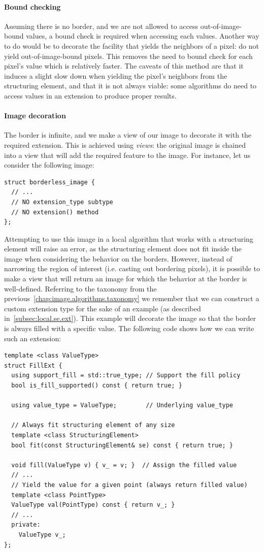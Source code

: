 \paragraph{Bound checking}
Assuming there is no border, and we are not allowed to access out-of-image-bound values, a bound check is required when
accessing each values. Another way to do would be to decorate the facility that yields the neighbors of a pixel: do not
yield out-of-image-bound pixels. This removes the need to bound check for each pixel's value which is relatively
faster. The caveats of this method are that it induces a slight slow down when yielding the pixel's neighbors from the
structuring element, and that it is not always viable: some algorithms do need to access values in an extension to
produce proper results.

\paragraph{Image decoration}
The border is infinite, and we make a view of our image to decorate it with the required extension. This is achieved
using \emph{views}: the original image is chained into a view that will add the required feature to the image. For
instance, let us consider the following image:
\begin{verbatim}
struct borderless_image {
  // ...
  // NO extension_type subtype
  // NO extension() method
};
\end{verbatim}

Attempting to use this image in a local algorithm that works with a structuring element will raise an error, as the
structuring element does not fit inside the image when considering the behavior on the borders. However, instead of
narrowing the region of interest (i.e. casting out bordering pixels), it is possible to make a view that will return an
image for which the behavior at the border is well-defined. Referring to the taxonomy from the
previous~\cref{chap:image.algorithms.taxonomy} we remember that we can construct a custom extension type for the sake of
an example (as described in~\cref{subsec:local.se.ext}). This example will decorate the image so that the border is
always filled with a specific value. The following code shows how we can write such an extension:
\begin{verbatim}
template <class ValueType>
struct FillExt {
  using support_fill = std::true_type; // Support the fill policy
  bool is_fill_supported() const { return true; }

  using value_type = ValueType;        // Underlying value_type

  // Always fit structuring element of any size
  template <class StructuringElement>
  bool fit(const StructuringElement& se) const { return true; }

  void fill(ValueType v) { v_ = v; }  // Assign the filled value
  // ...
  // Yield the value for a given point (always return filled value)
  template <class PointType>
  ValueType val(PointType) const { return v_; }
  // ...
  private:
    ValueType v_;
};
\end{verbatim}

